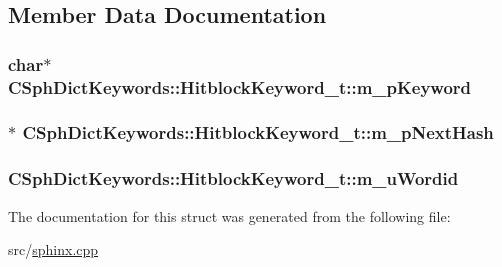 \subsection{Member Data Documentation}
\hypertarget{structCSphDictKeywords_1_1HitblockKeyword__t_a9f214b97cf55e3e118b8091720b1d7f2}{
\subsubsection[{m\-\_\-p\-Keyword}]{\setlength{\rightskip}{0pt plus 5cm}char$\ast$ C\-Sph\-Dict\-Keywords\-::\-Hitblock\-Keyword\-\_\-t\-::m\-\_\-p\-Keyword}}\label{structCSphDictKeywords_1_1HitblockKeyword__t_a9f214b97cf55e3e118b8091720b1d7f2}
\hypertarget{structCSphDictKeywords_1_1HitblockKeyword__t_acc7119fb73e1f05c020400947e29de0a}{
\subsubsection[{m\-\_\-p\-Next\-Hash}]{$\ast$ C\-Sph\-Dict\-Keywords\-::\-Hitblock\-Keyword\-\_\-t\-::m\-\_\-p\-Next\-Hash}}\label{structCSphDictKeywords_1_1HitblockKeyword__t_acc7119fb73e1f05c020400947e29de0a}
\hypertarget{structCSphDictKeywords_1_1HitblockKeyword__t_a3aab5604363411e4798ae35948578594}{
\subsubsection[{m\-\_\-u\-Wordid}]{ C\-Sph\-Dict\-Keywords\-::\-Hitblock\-Keyword\-\_\-t\-::m\-\_\-u\-Wordid}}\label{structCSphDictKeywords_1_1HitblockKeyword__t_a3aab5604363411e4798ae35948578594}


The documentation for this struct was generated from the following file\-:\begin{DoxyCompactItemize}
\item 
src/\hyperlink{sphinx_8cpp}{sphinx.\-cpp}\end{DoxyCompactItemize}
